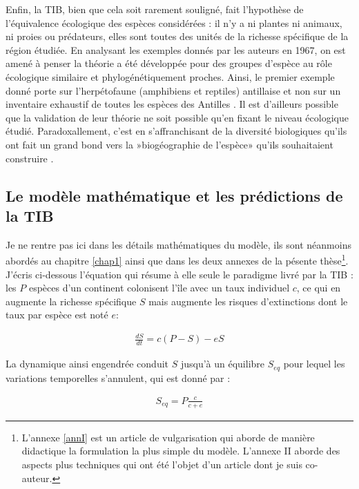 Enfin, la TIB, bien que cela soit rarement souligné, fait l'hypothèse de
l'équivalence écologique des espèces considérées : il n'y a ni plantes
ni animaux, ni proies ou prédateurs, elles sont toutes des unités de la
richesse spécifique de la région étudiée. En analysant les exemples
donnés par les auteurs en 1967, on est amené à penser la théorie a été
développée pour des groupes d'espèce au rôle écologique similaire et
phylogénétiquement proches. Ainsi, le premier exemple donné porte sur
l'herpétofaune (amphibiens et reptiles) antillaise et non sur un
inventaire exhaustif de toutes les espèces des Antilles
\citep{MacArthur1967}. Il est d'ailleurs possible que la validation de
leur théorie ne soit possible qu'en fixant le niveau écologique étudié.
Paradoxallement, c'est en s'affranchisant de la diversité biologiques
qu'ils ont fait un grand bond vers la »biogéographie de l'espèce» qu'ils
souhaitaient construire \citep[ p.183]{MacArthur1967}.

\subsection*{Le modèle mathématique et les prédictions de la
TIB}\label{le-moduxe8le-mathuxe9matique-et-les-pruxe9dictions-de-la-tib}

Je ne rentre pas ici dans les détails mathématiques du modèle, ils sont
néanmoins abordés au chapitre \ref{chap1} ainsi que dans les deux
annexes de la pésente thèse\footnote{L'annexe \ref{annI} est un article
  de vulgarisation qui aborde de manière didactique la formulation la
  plus simple du modèle. L'annexe II aborde des aspects plus techniques
  qui ont été l'objet d'un article dont je suis co-auteur.}. J'écris
ci-dessous l'équation qui résume à elle seule le paradigme livré par la
TIB : les \(P\) espèces d'un continent colonisent l'île avec un taux
individuel \(c\), ce qui en augmente la richesse spécifique \(S\) mais
augmente les risques d'extinctions dont le taux par espèce est noté
\(e\):

\begin{eqnarray}
\label{eqMW}
\frac{dS}{dt} = c(P-S)-eS
\end{eqnarray}

La dynamique ainsi engendrée conduit \(S\) jusqu'à un équilibre
\(S_{eq}\) pour lequel les variations temporelles s'annulent, qui est
donné par :

\begin{eqnarray}
S_{eq} = P \frac{c}{c+e}
\end{eqnarray}

